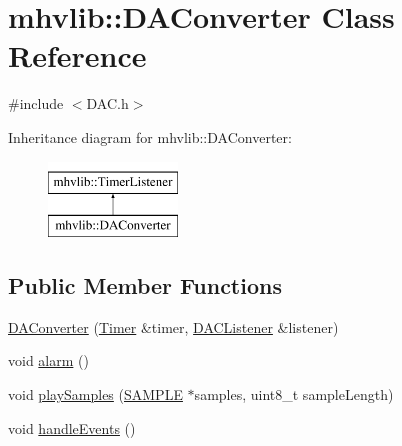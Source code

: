 \hypertarget{classmhvlib_1_1_d_a_converter}{\section{mhvlib\-:\-:D\-A\-Converter Class Reference}
\label{classmhvlib_1_1_d_a_converter}
}


{\ttfamily \#include $<$D\-A\-C.\-h$>$}

Inheritance diagram for mhvlib\-:\-:D\-A\-Converter\-:\begin{figure}[H]
\begin{center}
\leavevmode
\includegraphics[height=2.000000cm]{classmhvlib_1_1_d_a_converter}
\end{center}
\end{figure}
\subsection*{Public Member Functions}
\begin{DoxyCompactItemize}
\item 
\hyperlink{classmhvlib_1_1_d_a_converter_ac6c688a6ce2eb1d87fd737e1a9956fcc}{D\-A\-Converter} (\hyperlink{classmhvlib_1_1_timer}{Timer} \&timer, \hyperlink{classmhvlib_1_1_d_a_c_listener}{D\-A\-C\-Listener} \&listener)
\item 
void \hyperlink{classmhvlib_1_1_d_a_converter_a119e39c554671b7a7d11f38ad39b7991}{alarm} ()
\item 
void \hyperlink{classmhvlib_1_1_d_a_converter_af05d191e90326abbf95d6e84b820911d}{play\-Samples} (\hyperlink{_d_a_c_8h_a5a6d1dc37ffa32957a63868cd1da39b3}{S\-A\-M\-P\-L\-E} $\ast$samples, uint8\-\_\-t sample\-Length)
\item 
void \hyperlink{classmhvlib_1_1_d_a_converter_a184ede5a0b133c1f8cb568295deb6f67}{handle\-Events} ()
\end{DoxyCompactItemize}
